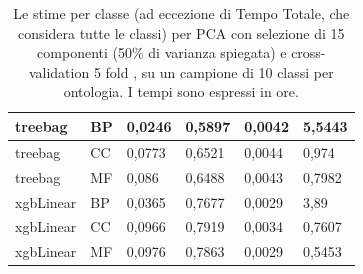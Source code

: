 \documentclass[12pt]{report}
\begin{document}
\begin{appendices}
\begin{table}[h]
\begin{tabular}{|l|l|l|l|l|l|}
treebag            & BP            & 0,0246         & 0,5897         & 0,0042                   & 5,5443               \\ \hline
treebag            & CC            & 0,0773         & 0,6521         & 0,0044                   & 0,974                \\ \hline
treebag            & MF            & 0,086          & 0,6488         & 0,0043                   & 0,7982               \\ \hline
xgbLinear          & BP            & 0,0365         & 0,7677         & 0,0029                   & 3,89                 \\ \hline
xgbLinear          & CC            & 0,0966         & 0,7919         & 0,0034                   & 0,7607               \\ \hline
xgbLinear          & MF            & 0,0976         & 0,7863         & 0,0029                   & 0,5453               \\ \hline
\end{tabular}
\caption{Le stime per classe (ad eccezione di Tempo Totale, che considera tutte le classi) per PCA con selezione di 15 componenti (50\% di varianza spiegata) e cross-validation 5 fold , su un campione di 10 classi per ontologia. I tempi sono espressi in ore.}
\label{PCA5fold}
\end{table}


\end{appendices}
\end{document}

